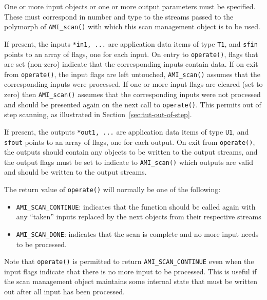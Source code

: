 One or more input objects or one or more output parameters must be
specified.  These must correspond in number and type to the streams
passed to the polymorph of \lstinline|AMI_scan()| with which this scan
management object is to be used.
    
If present, the inputs \lstinline|*in1, ...| are application data
items of type \lstinline|T1|, and \lstinline|sfin| points to an array
of flags, one for each input.  On entry to \lstinline|operate()|,
flags that are set (non-zero) indicate that the corresponding inputs
contain data.  If on exit from \lstinline|operate()|, the input flags
are left untouched, \lstinline|AMI_scan()| assumes that the
corresponding inputs were processed.  If one or more input flags are
cleared (set to zero) then \lstinline|AMI_scan()| assumes that the
corresponding inputs were not processed and should be presented again
on the next call to \lstinline|operate()|.  This permits out of step
scanning, as illustrated in
Section~\ref{sec:tut-out-of-step}.
    
If present, the outputs \lstinline|*out1, ...| are application data
items of type \lstinline|U1|, and \lstinline|sfout| points to an array
of flags, one for each output. On exit from \lstinline|operate()|, the
outputs should contain any objects to be written to the output
streams, and the output flags must be set to indicate to
\lstinline|AMI_scan()| which outputs are valid and should be written
to the output streams.
    
The return value of \lstinline|operate()| will normally be one of the
following:
    \begin{itemize}
    \item \lstinline|AMI_SCAN_CONTINUE|:  indicates that the function should be
      called again with any ``taken'' inputs replaced by the next
      objects from their respective streams
    \item \lstinline|AMI_SCAN_DONE|:  indicates that the scan is complete and no
      more input needs to be processed.
    \end{itemize}
    
    Note that \lstinline|operate()| is permitted to return
    \lstinline|AMI_SCAN_CONTINUE| even when the input flags indicate
    that there is no more input to be processed.  This is useful if
    the scan management object maintains some internal state that must
    be written out after all input has been processed.

